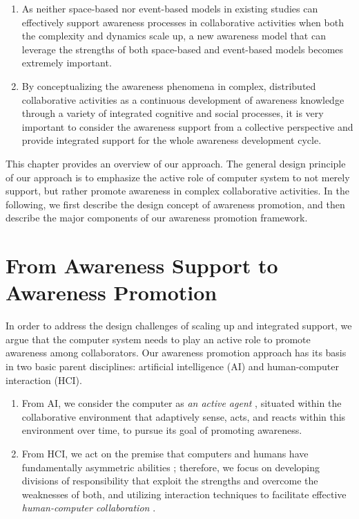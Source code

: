 \begin{enumerate}
   \item As neither space-based nor event-based models in existing studies can effectively support awareness processes in collaborative activities when both the complexity and dynamics scale up, a new awareness model that can leverage the strengths of both space-based and event-based models becomes extremely important.
   \item By conceptualizing the awareness phenomena in complex, distributed collaborative activities as a continuous development of awareness knowledge through a variety of integrated cognitive and social processes, it is very important to consider the awareness support from a collective perspective and provide integrated support for the whole awareness development cycle.
\end{enumerate}

This chapter provides an overview of our approach. The general design principle of our approach is to emphasize the active role of computer system to not merely support, but rather promote awareness in complex collaborative activities. In the following, we first describe the design concept of awareness promotion, and then describe the major components of our awareness promotion framework.

\section{From Awareness Support to Awareness Promotion} %
\label{sec:from_support_to_promotion}
In order to address the design challenges of scaling up and integrated support, we argue that the computer system needs to play an active role to promote awareness among collaborators. Our awareness promotion approach has its basis in two basic parent disciplines:  artificial intelligence (AI) and human-computer interaction (HCI). 
\begin{enumerate}
   \item From AI, we consider the computer as \emph{an active agent} \cite{Brown99activeuser}, situated within the collaborative environment that adaptively sense, acts, and reacts within this environment over time, to pursue its goal of promoting awareness.
   \item From HCI, we act on the premise that computers and humans have fundamentally asymmetric abilities \cite{Dalal1994}; therefore, we focus on developing divisions of responsibility that exploit the strengths and overcome the weaknesses of both, and utilizing interaction techniques to facilitate effective \emph{human-computer collaboration} \cite{Terveen1995}.
\end{enumerate}

